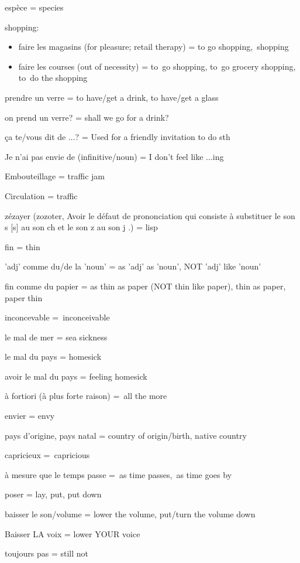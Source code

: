 {espèce = species}

{shopping:}

\begin{itemize}
\item
  {faire les magasins (for pleasure; retail therapy) = to go
  shopping,~}{shopping}{~}
\item
  {faire les courses (out of necessity) =} {to~}{go shopping,} {to~}{go
  grocery shopping,} {to~}{do the shopping}
\end{itemize}

{prendre un verre = to have/get a drink, to have/get a glass~}

{on prend un verre? = shall we go for a drink?}

{ça te/vous dit de ...? = Used for a friendly invitation to do sth}

{Je n'ai pas envie de (infinitive/noun) = I don't feel like ...ing}

{Embouteillage = traffic jam}

{Circulation = traffic~}

{zézayer (zozoter, Avoir le défaut de prononciation qui consiste à
substituer le son s {[}s{]} au son ch et le son z au son j .) = lisp}

{fin = thin}

{'adj' comme du/de la 'noun' = as 'adj' as 'noun', NOT 'adj' like
'noun'}

{fin comme du papier = as thin as paper (NOT thin like paper), thin as
paper, paper thin}

{inconcevable =~}{inconceivable}

{le mal de mer = sea sickness}

{le mal du pays = homesick}

{avoir le mal du pays = feeling homesick}

{à f}{ortiori (}{à plus forte raison) =~}{all the more}

{envier = envy}

{pays d'origine, pays natal = country of origin/birth, native country}

{capricieux =~}{capricious}

{à mesure que le temps passe =~}{as time passes,~}{as time goes by}

{poser = lay, put, put down}

{baisser le son/volume = lower the volume, put/turn the volume down}

{Baisser LA voix = lower YOUR voice~}

{toujours pas = still not}

